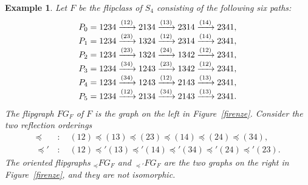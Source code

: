 \documentclass[12pt,reqno]{amsart}
\theoremstyle{plain}
\newtheorem{exa}[thm]{Example}
\theoremstyle{definition}
\theoremstyle{remark}
\begin{document}
\begin{exa}\label{diversi}
\newcommand{\flipto}[1]{\xrightarrow{(#1)}}%
Let $F$ be the flipclass of $S_4$ consisting of the following six paths:
\[
\begin{array}{@{}r@{\;=\;}l@{}}
P_0 & 1234 \flipto{12} 2134 \flipto{13} 2314 \flipto{14} 2341,\\
P_1 & 1234 \flipto{23} 1324 \flipto{12} 2314 \flipto{14} 2341,\\
P_2 & 1234 \flipto{23} 1324 \flipto{24} 1342 \flipto{12} 2341,\\
P_3 & 1234 \flipto{34} 1243 \flipto{23} 1342 \flipto{12} 2341,\\
P_4 & 1234 \flipto{34} 1243 \flipto{12} 2143 \flipto{13} 2341,\\
P_5 & 1234 \flipto{12} 2134 \flipto{34} 2143 \flipto{13} 2341.
\end{array}
\]
The flipgraph $FG_F$ of $F$ is the graph on the left in Figure~\ref{firenze}.
Consider the two reflection orderings
\begin{align*}
\preceq\,  &:\quad (12)\preceq(13)\preceq(23)\preceq(14)\preceq(24)\preceq(34),\\
\preceq'\, &:\quad (12)\preceq'(13)\preceq'(14)\preceq'(34)\preceq'(24)\preceq'(23).
\end{align*}
The oriented flipgraphs ${}_{\preceq}FG_F$ and ${}_{\preceq'}FG_F$ are the two
graphs on the right in Figure~\ref{firenze}, and they are not isomorphic.
\end{exa}
\end{document}
